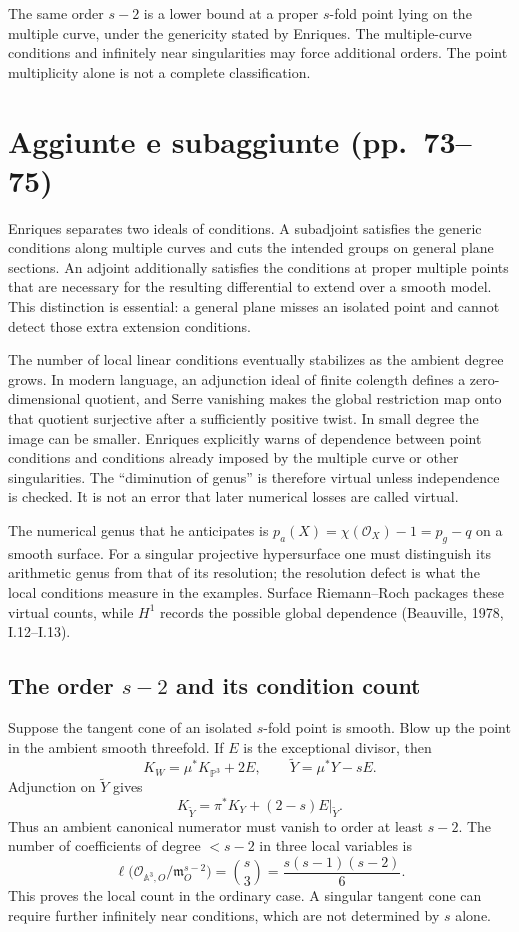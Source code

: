The same order \(s-2\) is a lower bound at a proper \(s\)-fold point lying on the multiple curve, under the genericity stated by Enriques. The multiple-curve conditions and infinitely near singularities may force additional orders. The point multiplicity alone is not a complete classification.

\section[Aggiunte e subaggiunte]{Aggiunte e subaggiunte (pp.~73--75)}\label{commentary-III-6}

Enriques separates two ideals of conditions. A subadjoint satisfies the generic conditions along multiple curves and cuts the intended groups on general plane sections. An adjoint additionally satisfies the conditions at proper multiple points that are necessary for the resulting differential to extend over a smooth model. This distinction is essential: a general plane misses an isolated point and cannot detect those extra extension conditions.

The number of local linear conditions eventually stabilizes as the ambient degree grows. In modern language, an adjunction ideal of finite colength defines a zero-dimensional quotient, and Serre vanishing makes the global restriction map onto that quotient surjective after a sufficiently positive twist. In small degree the image can be smaller. Enriques explicitly warns of dependence between point conditions and conditions already imposed by the multiple curve or other singularities. The ``diminution of genus'' is therefore virtual unless independence is checked. It is not an error that later numerical losses are called virtual.

The numerical genus that he anticipates is \(p_a(X)=\chi(\mathcal O_X)-1=p_g-q\) on a smooth surface. For a singular projective hypersurface one must distinguish its arithmetic genus from that of its resolution; the resolution defect is what the local conditions measure in the examples. Surface Riemann--Roch packages these virtual counts, while \(H^1\) records the possible global dependence (Beauville, 1978, I.12--I.13).

\subsection{\texorpdfstring{The order \(s-2\) and its condition count}{The order s-2 and its condition count}}

Suppose the tangent cone of an isolated \(s\)-fold point is smooth. Blow up the point in the ambient smooth threefold. If \(E\) is the exceptional divisor, then \[
K_W=\mu^*K_{\mathbb{P}^3}+2E,\qquad
\widetilde Y=\mu^*Y-sE.
\] Adjunction on \(\widetilde Y\) gives \[
K_{\widetilde Y}=\pi^*K_Y+(2-s)E|_{\widetilde Y}.
\] Thus an ambient canonical numerator must vanish to order at least \(s-2\). The number of coefficients of degree \(<s-2\) in three local variables is \[
\ell\bigl(\mathcal O_{\mathbb A^3,O}/\mathfrak m_O^{s-2}\bigr)
=\binom{s}{3}=\frac{s(s-1)(s-2)}6.
\tag{III.3}
\] This proves the local count in the ordinary case. A singular tangent cone can require further infinitely near conditions, which are not determined by \(s\) alone.

